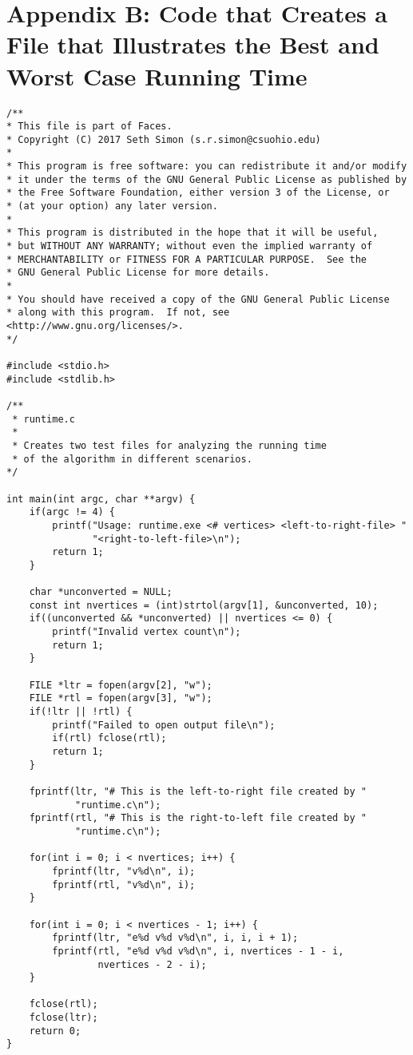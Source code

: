 \documentclass{article}
\begin{document}
\normalsize

\section{Appendix B: Code that Creates a File that Illustrates
the Best and Worst Case Running Time}
\small
\begin{verbatim}
/**
* This file is part of Faces.
* Copyright (C) 2017 Seth Simon (s.r.simon@csuohio.edu)
* 
* This program is free software: you can redistribute it and/or modify
* it under the terms of the GNU General Public License as published by
* the Free Software Foundation, either version 3 of the License, or
* (at your option) any later version.
* 
* This program is distributed in the hope that it will be useful,
* but WITHOUT ANY WARRANTY; without even the implied warranty of
* MERCHANTABILITY or FITNESS FOR A PARTICULAR PURPOSE.  See the
* GNU General Public License for more details.
* 
* You should have received a copy of the GNU General Public License
* along with this program.  If not, see <http://www.gnu.org/licenses/>.
*/

#include <stdio.h>
#include <stdlib.h>

/**
 * runtime.c
 *
 * Creates two test files for analyzing the running time
 * of the algorithm in different scenarios.
*/

int main(int argc, char **argv) {
    if(argc != 4) {
        printf("Usage: runtime.exe <# vertices> <left-to-right-file> "
               "<right-to-left-file>\n");
        return 1;
    }

    char *unconverted = NULL;
    const int nvertices = (int)strtol(argv[1], &unconverted, 10);
    if((unconverted && *unconverted) || nvertices <= 0) {
        printf("Invalid vertex count\n");
        return 1;
    }

    FILE *ltr = fopen(argv[2], "w");
    FILE *rtl = fopen(argv[3], "w");
    if(!ltr || !rtl) {
        printf("Failed to open output file\n");
        if(rtl) fclose(rtl);
        return 1;
    }

    fprintf(ltr, "# This is the left-to-right file created by "
            "runtime.c\n");
    fprintf(rtl, "# This is the right-to-left file created by "
            "runtime.c\n");

    for(int i = 0; i < nvertices; i++) {
        fprintf(ltr, "v%d\n", i);
        fprintf(rtl, "v%d\n", i);
    }

    for(int i = 0; i < nvertices - 1; i++) {
        fprintf(ltr, "e%d v%d v%d\n", i, i, i + 1);
        fprintf(rtl, "e%d v%d v%d\n", i, nvertices - 1 - i,
                nvertices - 2 - i);
    }

    fclose(rtl);
    fclose(ltr);
    return 0;
}
\end{verbatim}
\normalsize
\end{document}
